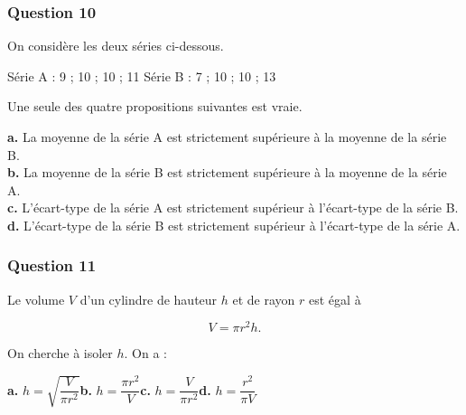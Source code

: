 \subsubsection*{Question 10}
On considère les deux séries ci-dessous.

Série A : 9 ; 10 ; 10 ; 11 \hfill Série B : 7 ; 10 ; 10 ; 13

Une seule des quatre propositions suivantes est vraie.

\textbf{a.} La moyenne de la série A est strictement supérieure à la moyenne de la série B. \\
\textbf{b.} La moyenne de la série B est strictement supérieure à la moyenne de la série A. \\
\textbf{c.} L'écart-type de la série A est strictement supérieur à l'écart-type de la série B. \\
\textbf{d.} L'écart-type de la série B est strictement supérieur à l'écart-type de la série A.

\subsubsection*{Question 11}
Le volume $V$ d'un cylindre de hauteur $h$ et de rayon $r$ est égal à

\[V = \pi r^2 h.\]

On cherche à isoler $h$. On a :

\textbf{a.} $h = \sqrt{\dfrac{V}{\pi r^2}}$\hfill \textbf{b.} $h = \dfrac{\pi r^2}{V}$\hfill \textbf{c.} $h = \dfrac{V}{\pi r^2}$\hfill \textbf{d.} $h = \dfrac{r^2}{\pi V}$

\bigskip

